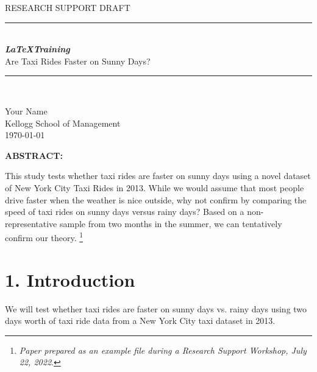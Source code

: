 \documentclass[11pt]{article}
\newcommand{\HRule}{\rule{\linewidth}{0.5mm}}
\begin{document}
 

\begin{titlepage}
\begin{center}

\textsc{\LARGE RESEARCH SUPPORT DRAFT}\\[0.5cm] 

\HRule \\[0.4cm]
{ \huge \bfseries \emph{ \LaTeX Training}  \\[0.4cm] }
{ \Large Are Taxi Rides Faster on Sunny Days?}
\HRule \\[1.5cm]

\begin{minipage}{0.75\textwidth}
\begin{center} 
\LARGE {Your Name}\\
\LARGE Kellogg School of Management\\
\LARGE \today
\end{center}
\end{minipage}

\vfill

{\bf ABSTRACT:}
\begin{flushleft}
This study tests whether taxi rides are faster on sunny days using a novel dataset of New York City Taxi Rides in 2013. While we would assume that most people drive faster when the weather is nice outside, why not confirm by comparing the speed of taxi rides on sunny days versus rainy days? Based on a non-representative sample from two months in the summer, we can tentatively confirm our theory. \footnote{\emph{Paper prepared as an example file during a Research Support Workshop, July 22, 2022}.}  

\end{flushleft}

\vfill


\end{center}
\end{titlepage}



\newpage

\section*{1. Introduction}

We will test whether taxi rides are faster on sunny days vs. rainy days using two days worth of taxi ride data from a New York City taxi dataset in 2013. 
\end{document}

